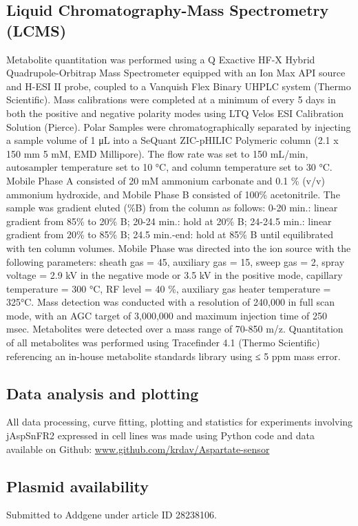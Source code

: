 \documentclass[9pt,lineno]{elife}
\begin{document}
\subsection{Liquid Chromatography-Mass Spectrometry (LCMS)}
Metabolite quantitation was performed using a Q Exactive HF-X Hybrid Quadrupole-Orbitrap Mass Spectrometer equipped with an Ion Max API source and H-ESI II probe, coupled to a Vanquish Flex Binary UHPLC system (Thermo Scientific).
Mass calibrations were completed at a minimum of every 5 days in both the positive and negative polarity modes using LTQ Velos ESI Calibration Solution (Pierce).
Polar Samples were chromatographically separated by injecting a sample volume of 1 μL into a SeQuant ZIC-pHILIC Polymeric column (2.1 x 150 mm 5 mM, EMD Millipore).
The flow rate was set to 150 mL/min, autosampler temperature set to 10 °C, and column temperature set to 30 °C.
Mobile Phase A consisted of 20 mM ammonium carbonate and 0.1 \% (v/v) ammonium hydroxide, and Mobile Phase B consisted of 100\% acetonitrile.
The sample was gradient eluted (\%B) from the column as follows: 0-20 min.: linear gradient from 85\% to 20\% B; 20-24 min.: hold at 20\% B; 24-24.5 min.: linear gradient from 20\% to 85\% B; 24.5 min.-end: hold at 85\% B until equilibrated with ten column volumes.
Mobile Phase was directed into the ion source with the following parameters: sheath gas = 45, auxiliary gas = 15, sweep gas = 2, spray voltage = 2.9 kV in the negative mode or 3.5 kV in the positive mode, capillary temperature = 300 °C, RF level = 40 \%, auxiliary gas heater temperature = 325°C.
Mass detection was conducted with a resolution of 240,000 in full scan mode, with an AGC target of 3,000,000 and maximum injection time of 250 msec.
Metabolites were detected over a mass range of 70-850 m/z.
Quantitation of all metabolites was performed using Tracefinder 4.1 (Thermo Scientific) referencing an in-house metabolite standards library using ≤ 5 ppm mass error.

\subsection{Data analysis and plotting}
All data processing, curve fitting, plotting and statistics for experiments involving jAspSnFR2 expressed in cell lines was made using Python code and data available on Github:
\url{www.github.com/krdav/Aspartate-sensor}

\subsection{Plasmid availability}
Submitted to Addgene under article ID 28238106.
\end{document}
